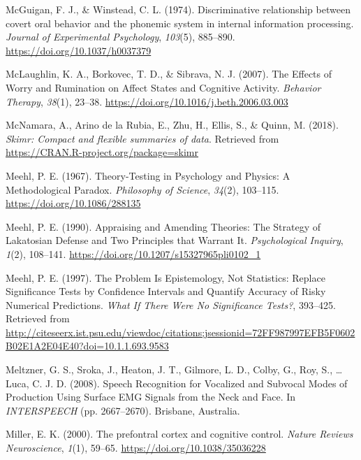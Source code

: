 \documentclass[a4paper,12pt,twoside,onecolumn,openright,final,oldfontcommands]{memoir}
\begin{document}
\leavevmode\hypertarget{ref-mcguigan_discriminative_1974}{}%
McGuigan, F. J., \& Winstead, C. L. (1974). Discriminative relationship between covert oral behavior and the phonemic system in internal information processing. \emph{Journal of Experimental Psychology}, \emph{103}(5), 885--890. \url{https://doi.org/10.1037/h0037379}

\leavevmode\hypertarget{ref-mclaughlin_effects_2007}{}%
McLaughlin, K. A., Borkovec, T. D., \& Sibrava, N. J. (2007). The Effects of Worry and Rumination on Affect States and Cognitive Activity. \emph{Behavior Therapy}, \emph{38}(1), 23--38. \url{https://doi.org/10.1016/j.beth.2006.03.003}

\leavevmode\hypertarget{ref-R-skimr}{}%
McNamara, A., Arino de la Rubia, E., Zhu, H., Ellis, S., \& Quinn, M. (2018). \emph{Skimr: Compact and flexible summaries of data}. Retrieved from \url{https://CRAN.R-project.org/package=skimr}

\leavevmode\hypertarget{ref-meehl_theory-testing_1967}{}%
Meehl, P. E. (1967). Theory-Testing in Psychology and Physics: A Methodological Paradox. \emph{Philosophy of Science}, \emph{34}(2), 103--115. \url{https://doi.org/10.1086/288135}

\leavevmode\hypertarget{ref-meehl_appraising_1990}{}%
Meehl, P. E. (1990). Appraising and Amending Theories: The Strategy of Lakatosian Defense and Two Principles that Warrant It. \emph{Psychological Inquiry}, \emph{1}(2), 108--141. \url{https://doi.org/10.1207/s15327965pli0102_1}

\leavevmode\hypertarget{ref-harlow_problem_1997}{}%
Meehl, P. E. (1997). The Problem Is Epistemology, Not Statistics: Replace Significance Tests by Confidence Intervals and Quantify Accuracy of Risky Numerical Predictions. \emph{What If There Were No Significance Tests?}, 393--425. Retrieved from \url{http://citeseerx.ist.psu.edu/viewdoc/citations;jsessionid=72FF987997EFB5F0602B02E1A2E04E40?doi=10.1.1.693.9583}

\leavevmode\hypertarget{ref-meltzner_speech_2008}{}%
Meltzner, G. S., Sroka, J., Heaton, J. T., Gilmore, L. D., Colby, G., Roy, S., \ldots{} Luca, C. J. D. (2008). Speech Recognition for Vocalized and Subvocal Modes of Production Using Surface EMG Signals from the Neck and Face. In \emph{INTERSPEECH} (pp. 2667--2670). Brisbane, Australia.

\leavevmode\hypertarget{ref-miller_prefontral_2000}{}%
Miller, E. K. (2000). The prefontral cortex and cognitive control. \emph{Nature Reviews Neuroscience}, \emph{1}(1), 59--65. \url{https://doi.org/10.1038/35036228}
\end{document}
